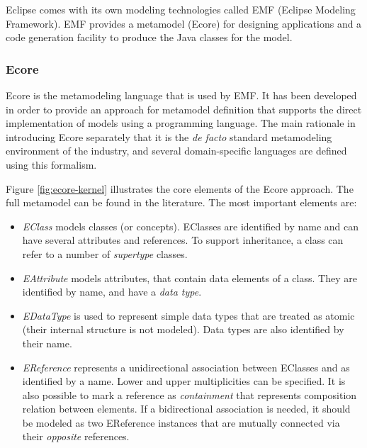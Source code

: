 Eclipse comes with its own modeling technologies called EMF (Eclipse Modeling Framework). EMF provides a metamodel (Ecore) for designing applications and a code generation facility to produce the Java classes for the model.

\subsubsection{Ecore}
\label{ecore}


Ecore is the metamodeling language that is used by EMF. It has been developed in order to provide an approach
for metamodel definition that supports the direct implementation of models using a programming language. 
The main rationale in introducing Ecore separately that it is the \emph{de facto}
standard metamodeling environment of the industry, and several domain-specific
languages are defined using this formalism.

 
 
 Figure \ref{fig:ecore-kernel} illustrates the core elements of the Ecore approach. The full metamodel can be found in the literature. The most important elements are:

\begin{itemize}
  \item \emph{EClass} models classes (or concepts). EClasses are identified by
  name and can have several attributes and references. To support inheritance,
  a class can refer to a number of \emph{supertype} classes.
  \item \emph{EAttribute} models attributes, that contain data elements of a
  class. They are identified by name, and have a \emph{data type}.
  \item \emph{EDataType} is used to represent simple data types that are
  treated as atomic (their internal structure is not modeled). Data types are
  also identified by their name.
  \item \emph{EReference} represents a unidirectional association between
  EClasses and as identified by a name. Lower and upper multiplicities can be 
  specified. It is also possible to mark a reference as \emph{containment} that
  represents composition relation between elements. If a bidirectional
  association is needed, it should be modeled as two EReference instances
  that are mutually connected via their \emph{opposite} references.
\end{itemize}

